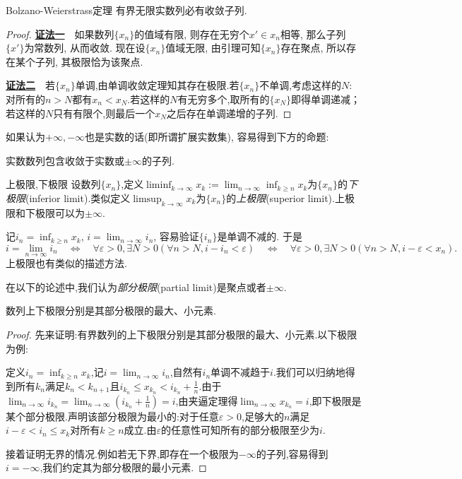 \begin{theorem}{Bolzano-Weierstrass定理}
	有界无限实数列必有收敛子列.
\end{theorem}
\begin{proof}
	\underline{\textbf{证法一}}~~如果数列$\{ x_n \}$的值域有限, 则存在无穷个$x' \in x_n$相等, 那么子列$\{ x' \}$为常数列, 从而收敛. 现在设$\{ x_n \}$值域无限, 由引理可知$\{ x_n \}$存在聚点, 所以存在某个子列, 其极限恰为该聚点.
	
	\underline{\textbf{证法二}}~~若$\{ x_n \}$单调,由单调收敛定理知其存在极限.若$\{ x_n \}$不单调,考虑这样的$N$:对所有的$n>N$都有$x_n<x_N$.若这样的$N$有无穷多个,取所有的$\{ x_N \}$即得单调递减；若这样的$N$只有有限个,则最后一个$x_N$之后存在单调递增的子列.
\end{proof}

如果认为$+\infty ,-\infty$也是实数的话(即所谓扩展实数集), 容易得到下方的命题:

\begin{proposition}{}
	实数数列包含收敛于实数或$\pm \infty$的子列.
\end{proposition}

\begin{definition}{上极限,下极限}
	设数列$\{ x_n \}$,定义$\liminf_{k\to \infty} x_k:=\lim_{n\to \infty} \inf_{k \geq n} x_k$为$\{ x_n \}$的\textit{下极限}(inferior limit).类似定义$\limsup_{k\to \infty} x_k$为$\{ x_n \}$的\textit{上极限}(superior limit).上极限和下极限可以为$\pm \infty$.
\end{definition}

记$i_n=\inf_{k\geq n}x_k$, $i=\lim_{n\to \infty} i_{n}$, 容易验证$\{ i_n \}$是单调不减的. 于是$$i=\lim_{n\to \infty} i_{n} \quad \Leftrightarrow \quad \forall \varepsilon >0, \exists N>0 (\forall n>N, i-i_n<\varepsilon) \quad \Leftrightarrow \quad \forall \varepsilon >0, \exists N>0 (\forall n>N, i-\varepsilon<x_n).$$
上极限也有类似的描述方法. 

在以下的论述中,我们认为\textit{部分极限}(partial limit)是聚点或者$\pm \infty$.

\begin{proposition}{}
	数列上下极限分别是其部分极限的最大、小元素.
\end{proposition}
\begin{proof}
	先来证明:有界数列的上下极限分别是其部分极限的最大、小元素.以下极限为例:
	
	定义$i_n=\inf_{k\geq n}x_k$,记$i=\lim_{n\to \infty} i_{n}$,自然有$i_n$单调不减趋于$i$.我们可以归纳地得到所有$k_n$满足$k_n<k_{n+1}$且$i_{k_n} \leq x_{k_n} < i_{k_n}+\frac{1}{n}$.由于$\lim_{n\to \infty} i_{k_n} = \lim_{n\to \infty} (i_{k_n}+\frac{1}{n} ) = i$,由夹逼定理得$\lim_{n\to \infty} x_{k_n}=i$,即下极限是某个部分极限.声明该部分极限为最小的:对于任意$\varepsilon >0$,足够大的$n$满足$i-\varepsilon < i_n \leq x_k$对所有$k \geq n$成立.由$\varepsilon$的任意性可知所有的部分极限至少为$i$.
	
	接着证明无界的情况.例如若无下界,即存在一个极限为$-\infty$的子列,容易得到$i=-\infty$,我们约定其为部分极限的最小元素.
\end{proof}

